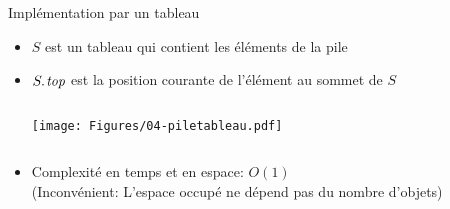 \begin{frame}{Implémentation par un tableau}

\begin{itemize}
\item $S$ est un tableau qui contient les éléments de la pile
\item $\attrib{S}{top}$ est la position courante de l'élément au sommet de $S$

\medskip

\begin{columns}
\begin{column}{5cm}
\centerline{\texttt{[image: Figures/04-piletableau.pdf]}}

\bigskip

\begin{center}
\begin{small}
\end{small}
\end{center}

\end{column}
\begin{column}{5cm}
    \begin{center}
      \begin{small}

\bigskip


      \end{small}
    \end{center}
\end{column}
\end{columns}

\item Complexité en temps \alert{et en espace}: $O(1)$\\
(Inconvénient: L'espace occupé ne dépend pas du nombre d'objets)
\end{itemize}

\end{frame}


